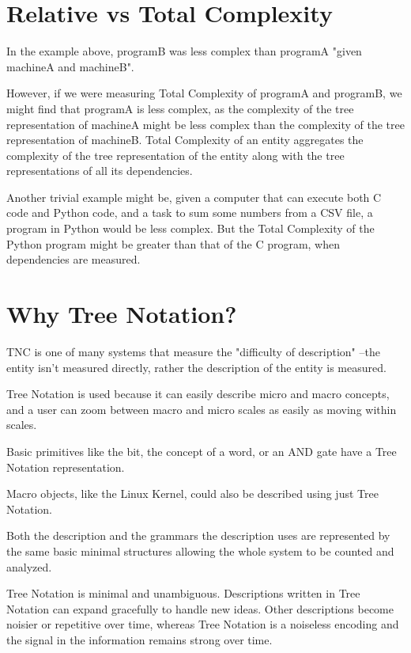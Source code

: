 \documentclass[journal]{IEEEtran}
\begin{document}
\section{Relative vs Total Complexity}

In the example above, programB was less complex than programA "given machineA and machineB".

However, if we were measuring Total Complexity of programA and programB, we might find that programA is less complex, as the complexity of the tree representation of machineA might be less complex than the complexity of the tree representation of machineB. Total Complexity of an entity aggregates the complexity of the tree representation of the entity along with the tree representations of all its dependencies.

Another trivial example might be, given a computer that can execute both C code and Python code, and a task to sum some numbers from a CSV file, a program in Python would be less complex. But the Total Complexity of the Python program might be greater than that of the C program, when dependencies are measured.


\section{Why Tree Notation?}

TNC is one of many systems that measure the "difficulty of description" \cite{Lloyd}--the entity isn't measured directly, rather the description of the entity is measured.

Tree Notation is used because it can easily describe micro and macro concepts, and a user can zoom between macro and micro scales as easily as moving within scales.

Basic primitives like the bit, the concept of a word, or an AND gate have a Tree Notation representation.

Macro objects, like the Linux Kernel, could also be described using just Tree Notation.

Both the description and the grammars the description uses are represented by the same basic minimal structures allowing the whole system to be counted and analyzed.

Tree Notation is minimal and unambiguous. Descriptions written in Tree Notation can expand gracefully to handle new ideas. Other descriptions become noisier or repetitive over time, whereas Tree Notation is a noiseless encoding and the signal in the information remains strong over time.
\end{document}
